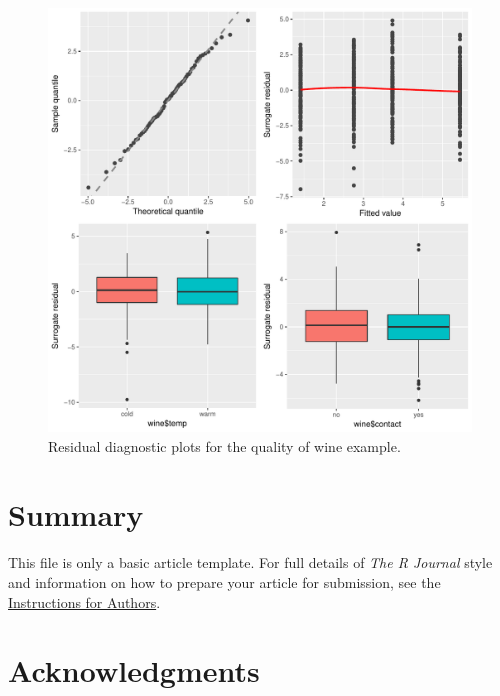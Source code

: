 \begin{figure}[!htbp]
  \centering
  \includegraphics[width=1\textwidth]{wine}
  \caption{Residual diagnostic plots for the quality of wine example.}
  \label{fig:wine}
\end{figure}



\section{Summary}

This file is only a basic article template. For full details of \emph{The R Journal} style and information on how to prepare your article for submission, see the \href{https://journal.r-project.org/share/author-guide.pdf}{Instructions for Authors}.


\section{Acknowledgments}

